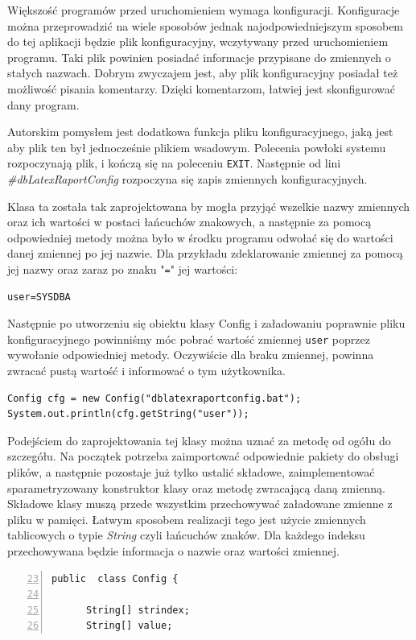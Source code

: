 Większość programów przed uruchomieniem wymaga konfiguracji. Konfiguracje można przeprowadzić na wiele sposobów jednak najodpowiedniejszym sposobem do tej aplikacji będzie plik konfiguracyjny, wczytywany przed uruchomieniem programu. Taki plik powinien posiadać informacje przypisane do zmiennych o stałych nazwach. Dobrym zwyczajem jest, aby plik konfiguracyjny posiadał też możliwość pisania komentarzy. Dzięki komentarzom, łatwiej jest skonfigurować dany program.
\par
Autorskim pomysłem jest dodatkowa funkcja pliku konfiguracyjnego, jaką jest aby plik ten był jednocześnie plikiem wsadowym. Polecenia powłoki systemu rozpoczynają plik, i kończą się na poleceniu \texttt{EXIT}. Następnie od lini \emph{\#dbLatexRaportConfig} rozpoczyna się zapis zmiennych konfiguracyjnych.
\par
Klasa ta została tak zaprojektowana by mogła przyjąć wszelkie nazwy zmiennych oraz ich wartości w postaci łańcuchów znakowych, a następnie za pomocą odpowiedniej metody można było w środku programu odwołać się do wartości danej zmiennej po jej nazwie. Dla przykładu zdeklarowanie zmiennej za pomocą jej nazwy oraz zaraz po znaku "\texttt{=}"  jej wartości:
\begin{lstlisting}
user=SYSDBA
\end{lstlisting}
Następnie po utworzeniu się obiektu klasy Config i załadowaniu poprawnie pliku konfiguracyjnego powinniśmy móc pobrać wartość  zmiennej \texttt{user} poprzez wywołanie odpowiedniej metody. Oczywiście dla braku zmiennej, powinna zwracać pustą wartość i informować o tym użytkownika.
\begin{lstlisting}
Config cfg = new Config("dblatexraportconfig.bat");
System.out.println(cfg.getString("user"));
\end{lstlisting}

Podejściem do zaprojektowania tej klasy można uznać za metodę od ogółu do szczegółu. Na początek potrzeba zaimportować odpowiednie pakiety do obsługi plików, a następnie pozostaje już tylko ustalić składowe, zaimplementować sparametryzowany konstruktor klasy oraz metodę zwracającą daną zmienną. Składowe klasy muszą przede wszystkim przechowywać załadowane zmienne z pliku w pamięci. Łatwym sposobem realizacji tego jest użycie zmiennych tablicowych o typie \emph{String} czyli łańcuchów znaków. Dla każdego indeksu przechowywana będzie informacja o nazwie oraz wartości zmiennej. 
\begin{lstlisting}[numbers=left,firstnumber=23]
public  class Config {

      String[] strindex;
      String[] value; 
\end{lstlisting}

